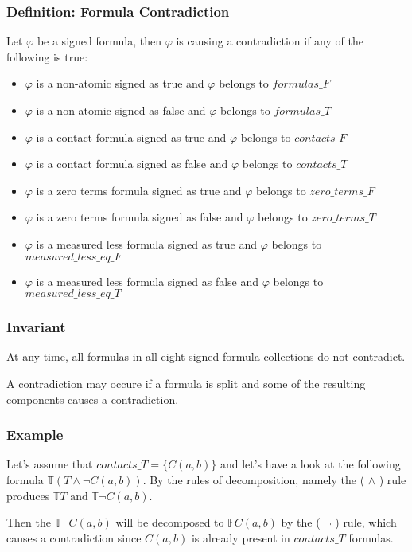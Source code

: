 \documentclass{article}
\begin{document}
	\subsubsection*{Definition: Formula Contradiction}
	Let $\varphi$ be a signed formula, then $\varphi$ is causing a contradiction if any of the following is true:
	\begin{itemize}
		\item $\varphi$ is a non-atomic signed as true and $\varphi$ belongs to $formulas\_F$
		\item $\varphi$ is a non-atomic signed as false and $\varphi$ belongs to $formulas\_T$
		\item $\varphi$ is a contact formula signed as true and $\varphi$ belongs to $contacts\_F$
		\item $\varphi$ is a contact formula signed as false and $\varphi$ belongs to $contacts\_T$
		\item $\varphi$ is a zero terms formula signed as true and $\varphi$ belongs to $zero\_terms\_F$
		\item $\varphi$ is a zero terms formula signed as false and $\varphi$ belongs to $zero\_terms\_T$
		\item $\varphi$ is a measured less formula signed as true and $\varphi$ belongs to $measured\_less\_eq\_F$
		\item $\varphi$ is a measured less formula signed as false and $\varphi$ belongs to $measured\_less\_eq\_T$
	\end{itemize}

	\subsubsection*{Invariant}
	At any time, all formulas in all eight signed formula collections do not contradict.

	A contradiction may occure if a formula is split and some of the resulting components causes a contradiction.

	\subsubsection*{Example}
	Let's assume that $contacts\_T = \{ C(a, b)\}$ and let's have a look at the following formula $\mathbb{T}(T \wedge \neg C(a,b))$.
	\newline
	By the rules of decomposition, namely the ( $\wedge$ ) rule produces $\mathbb{T}T \text{ and } \mathbb{T}\neg C(a,b)$.

	Then the $\mathbb{T}\neg C(a,b)$ will be decomposed to $\mathbb{F} C(a,b)$ by the ( $\neg$ ) rule, which causes a contradiction since $C(a,b)$ is already present in $contacts\_T$ formulas.
\end{document}
